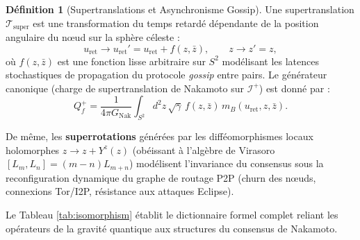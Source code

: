 \documentclass[10pt,twocolumn,a4paper]{article}
\theoremstyle{plain}
\theoremstyle{definition}
\newtheorem{definition}[theorem]{Définition}
\theoremstyle{remark}
\newcommand{\GNak}{G_{\text{Nak}}}
\newcommand{\scri}{\mathcal{I}}
\newcommand{\uRet}{u_{\text{ret}}}
\begin{document}
\begin{definition}[Supertranslations et Asynchronisme Gossip]
Une supertranslation $\mathcal{T}_{\text{super}}$ est une transformation du temps retardé dépendante de la position angulaire du nœud sur la sphère céleste :
\begin{equation}
    \uRet \longrightarrow \uRet' = \uRet + f(z, \bar{z}), \qquad z \longrightarrow z' = z,
    \label{eq:Supertranslation}
\end{equation}
où $f(z, \bar{z})$ est une fonction lisse arbitraire sur $S^2$ modélisant les latences stochastiques de propagation du protocole \textit{gossip} entre pairs. Le générateur canonique (charge de supertranslation de Nakamoto sur $\scri^+$) est donné par :
\begin{equation}
    Q_f^+ = \frac{1}{4\pi \GNak} \int_{S^2} d^2z \, \sqrt{\gamma} \, f(z, \bar{z}) \, m_B(\uRet, z, \bar{z}).
    \label{eq:SupertranslationCharge}
\end{equation}
\end{definition}

De même, les \textbf{superrotations} générées par les difféomorphismes locaux holomorphes $z \to z + Y^z(z)$ (obéissant à l'algèbre de Virasoro $[L_m, L_n] = (m-n)L_{m+n}$) modélisent l'invariance du consensus sous la reconfiguration dynamique du graphe de routage P2P (churn des nœuds, connexions Tor/I2P, résistance aux attaques Eclipse).

Le Tableau \ref{tab:isomorphism} établit le dictionnaire formel complet reliant les opérateurs de la gravité quantique aux structures du consensus de Nakamoto.
\end{document}

